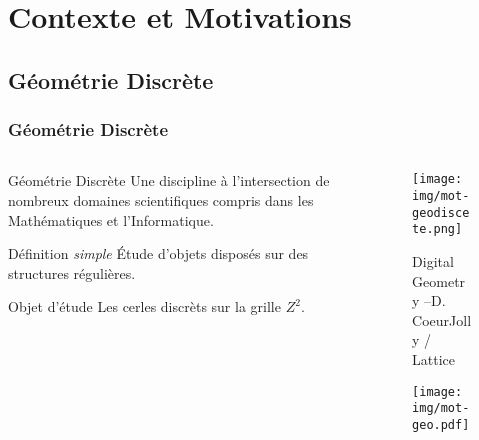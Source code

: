 \documentclass{beamer}
\begin{document}
\section{Contexte et Motivations}

\subsection{Géométrie Discrète}
\begin{frame}
  \frametitle{Géométrie Discrète}

  \begin{columns}[t]
    \begin{column}{6cm}
      \begin{block}{Géométrie Discrète}
        Une discipline à l'intersection de nombreux domaines scientifiques compris dans les Mathématiques et l'Informatique.
      \end{block}
      
      \begin{block}{Définition \textit{simple}}
       Étude d'objets disposés sur des structures régulières.
      \end{block}
      
      \begin{block}{Objet d'étude}
        Les \alert{cerles discrèts} sur la grille $Z^2$.
      \end{block}
    \end{column}

    \begin{column}{4cm}
      \vspace{-0.7cm}
      \begin{figure}[h!]
      \centering
         \texttt{[image: img/mot-geodiscete.png]}
      \caption{Digital Geometry --D. CoeurJolly / Lattice}
    \end{figure}
    
    \vspace{-1cm}
    \begin{figure}[h!]
      \centering
        \texttt{[image: img/mot-geo.pdf]}
      \end{figure}
    \end{column}
  \end{columns}  
\end{frame}
\end{document}
